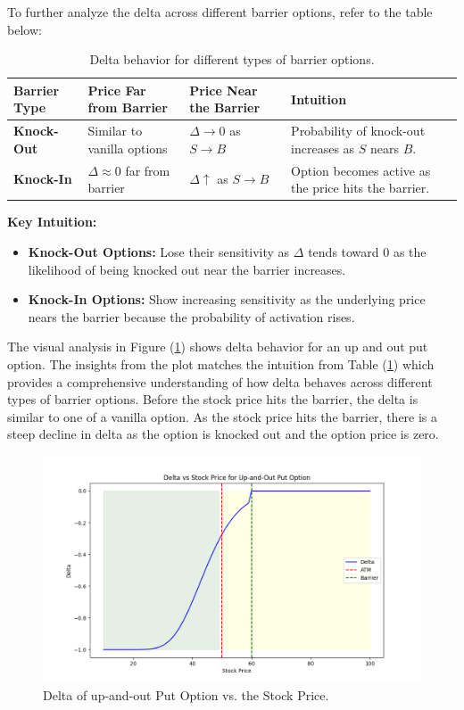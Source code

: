 To further analyze the delta across different barrier options, refer to the table below:
\begin{center}
	\begin{table}[H]
		\begin{tabular}{ | m{3cm} | m{5cm}| m{4cm} | m{4cm}|} 
			\hline
			\textbf{Barrier Type} & \textbf{Price Far from Barrier} & \textbf{Price Near the Barrier} & \textbf{Intuition}  \\
			\hline
			\textbf{Knock-Out} & Similar to vanilla options     & $\Delta \to 0$ as $S \to B$  & Probability of knock-out increases as $S$ nears $B$. \\ 
			\hline
			\textbf{Knock-In}  & $\Delta \approx 0$ far from barrier   & $\Delta \uparrow$ as $S \to B$  & Option becomes active as the price hits the barrier. \\ 
			\hline
		\end{tabular}
		\caption{Delta behavior for different types of barrier options.}
		\label{tab:delta_barrier_options}
	\end{table}
\end{center}
\textbf{Key Intuition:}
\begin{itemize}
	\item \textbf{Knock-Out Options:} Lose their sensitivity as $\Delta$ tends toward $0$ as the likelihood of being knocked out near the barrier increases.
	\item \textbf{Knock-In Options:} Show increasing sensitivity as the underlying price nears the barrier because the probability of activation rises.
\end{itemize}

The visual analysis in Figure (\ref{fig:delta_upout}) shows delta behavior for an up and out put option. The insights from the plot matches the intuition from Table (\ref{tab:delta_barrier_options}) which provides a comprehensive understanding of how delta behaves across different types of barrier options. Before the stock price hits the barrier, the delta is similar to one of a vanilla option. As the stock price hits the barrier, there is a steep decline in delta as the option is knocked out and the option price is zero.
\begin{figure}[H]
    \centering
    \includegraphics[width=.65\linewidth]{content/images/delta.png}
    \caption{Delta of up-and-out Put Option vs. the Stock Price.}
    \label{fig:delta_upout}
\end{figure}

